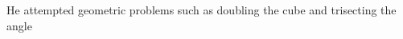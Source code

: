 \documentclass[preview]{standalone}
\begin{document}
\begin{center}
He attempted geometric problems such as doubling the cube and trisecting the angle
\end{center}
\end{document}
